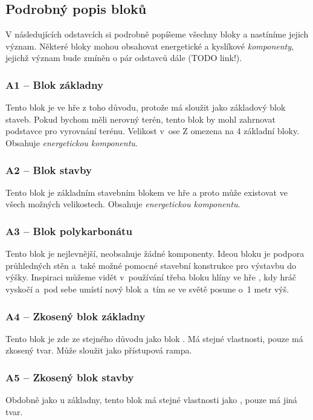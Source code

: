 \subsection{Podrobný popis bloků}

V následujících odstavcích si podrobně popíšeme všechny bloky  a nastíníme jejich význam. Některé bloky mohou obsahovat energetické a kyslíkové \textit{komponenty}, jejichž význam bude zmíněn o pár odstavců dále (TODO link!).



\subsubsection{A1 -- Blok základny}
\label{blocks:A1}
Tento blok je ve hře z toho důvodu, protože má sloužit jako základový blok staveb. Pokud bychom měli nerovný terén, tento blok by mohl zahrnovat podstavce pro vyrovnání terénu. Velikost v~ose Z omezena na 4 základní bloky. Obsahuje \textit{energetickou komponentu}.


\subsubsection{A2 -- Blok stavby}
\label{blocks:A2}
Tento blok je základním stavebním blokem ve hře a proto může existovat ve všech možných velikostech. Obsahuje \textit{energetickou komponentu}.


\subsubsection{A3 -- Blok polykarbonátu}
\label{blocks:A3}
Tento blok je nejlevnější, neobsahuje žádné komponenty. Ideou bloku je podpora průhledných stěn a~také možné pomocné stavební konstrukce pro výstavbu do výšky. Inspiraci můžeme vidět v~používání třeba bloku hlíny ve hře \MC{}, kdy hráč vyskočí a~pod sebe umístí nový blok a~tím se ve světě posune o~1 metr výš.


\subsubsection{A4 -- Zkosený blok základny}
\label{blocks:A4}
Tento blok je zde ze stejného důvodu jako blok . Má stejné vlastnosti, pouze má zkosený tvar. Může sloužit jako přístupová rampa.


\subsubsection{A5 -- Zkosený blok stavby}
\label{blocks:A5}
Obdobně jako u základny, tento blok má stejné vlastnosti jako , pouze má jiná tvar.


